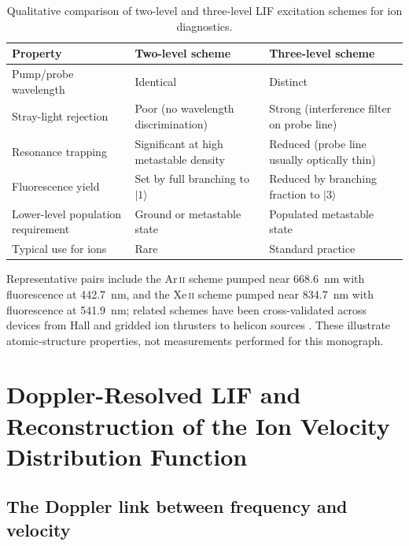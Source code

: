 \begin{table}[h]
\centering
\caption{Qualitative comparison of two-level and three-level LIF excitation schemes for ion diagnostics.}
\label{tab:lif-schemes}
\begin{tabularx}{\linewidth}{@{}lXX@{}}
\toprule
Property & Two-level scheme & Three-level scheme \\
\midrule
Pump/probe wavelength & Identical & Distinct \\
Stray-light rejection & Poor (no wavelength discrimination) & Strong (interference filter on probe line) \\
Resonance trapping & Significant at high metastable density & Reduced (probe line usually optically thin) \\
Fluorescence yield & Set by full branching to $\lvert 1\rangle$ & Reduced by branching fraction to $\lvert 3\rangle$ \\
Lower-level population requirement & Ground or metastable state & Populated metastable state \\
Typical use for ions & Rare & Standard practice \\
\bottomrule
\end{tabularx}
\end{table}

Representative pairs include the Ar\,\textsc{ii} scheme pumped near \SI{668.6}{\nano\meter} with fluorescence at \SI{442.7}{\nano\meter}, and the Xe\,\textsc{ii} scheme pumped near \SI{834.7}{\nano\meter} with fluorescence at \SI{541.9}{\nano\meter}; related schemes have been cross-validated across devices from Hall and gridded ion thrusters to helicon sources \cite{ref0304,ref0322}. These illustrate atomic-structure properties, not measurements performed for this monograph.

\section{Doppler-Resolved LIF and Reconstruction of the Ion Velocity Distribution Function}

\subsection{The Doppler link between frequency and velocity}

